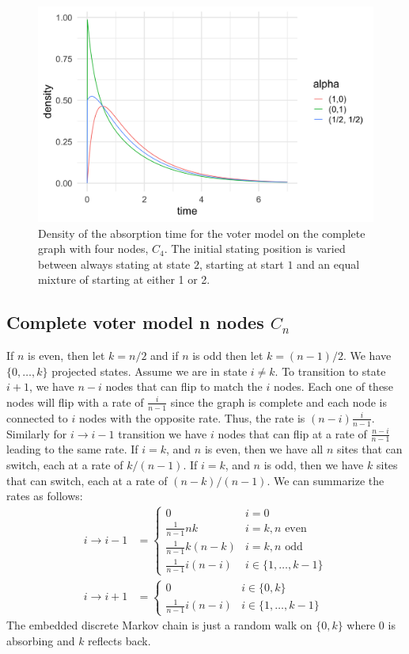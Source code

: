 \begin{figure}[H]
  \centering
    \includegraphics[width=.80\textwidth]{figures/voter_density_c4.png}
   \caption{Density of the absorption time for the voter model on the complete graph with four nodes, $C_4$. The initial stating position is varied between always stating at state $2$, starting at start $1$ and an equal mixture of starting at either 1 or 2.}
  \label{fig:voter_density_c4}
\end{figure}

\subsection{Complete voter model n nodes  \texorpdfstring{$C_n$}{VCn}}
If $n$ is even, then let $k = n / 2$ and if $n$ is odd then let $k = (n - 1)/2$.
We have $\{0,\ldots, k\}$ projected states.
Assume we are in state $i \not = k$.
To transition to state $i + 1$, we have $n - i$ nodes that can flip to match the $i$ nodes.
Each one of these nodes will flip with a rate of $\frac{i}{n - 1}$ since the graph is complete and each node is connected to $i$ nodes with the opposite rate.
Thus, the rate is $(n - i) \frac{i}{n - 1}$.
Similarly for $i \to i - 1$ transition we have $i$ nodes that can flip at a rate of $\frac{n - i}{n - 1}$ leading to the same rate.
If $i = k$, and $n$ is even, then we have all $n$ sites that can switch, each at a rate of $k / (n - 1)$.
If $i = k$, and $n$ is odd, then we have $k$ sites that can switch, each at a rate of $(n - k ) / (n - 1)$.
We can summarize the rates as follows:
\begin{align*}
    i \to i - 1 &= \begin{cases}
        0 & i = 0\\
        \frac{1}{n - 1} nk & i = k, n \text{ even}\\
        \frac{1}{n - 1}k (n - k) & i = k, n \text{ odd}\\
        \frac{1}{n - 1} i (n - i) & i \in \{1,\ldots, k - 1\}
    \end{cases}\\
    i \to i + 1 &= \begin{cases}
        0 & i \in \{0, k\}\\
        \frac{1}{n - 1} i (n - i) & i \in \{1,\ldots, k - 1\}
    \end{cases}
\end{align*}
The embedded discrete Markov chain is just a random walk on $\{0, k\}$ where 0 is absorbing and $k$ reflects back.

